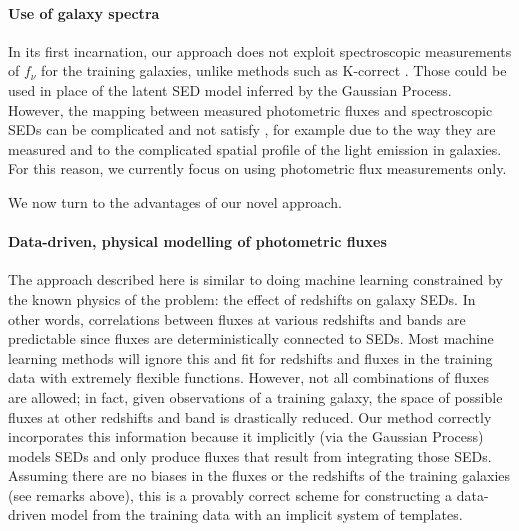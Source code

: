 \documentclass[aps,prd,showpacs,superscriptaddress,groupedaddress]{revtex4}  %
\begin{document}
\paragraph{Use of galaxy spectra}
In its first incarnation, our approach does not exploit spectroscopic measurements of $f_\nu$ for the training galaxies, unlike methods such as K-correct \cite{Blanton:2007}.
Those could be used in place of the latent SED model inferred by the Gaussian Process. 
However, the mapping between measured photometric fluxes and spectroscopic SEDs can be complicated and not satisfy , for example due to the way they are measured and to the complicated spatial profile of the light emission in galaxies. 
For this reason, we currently focus on using photometric flux measurements only.

\smallskip
We now turn to the advantages of our novel approach.
\smallskip

\paragraph{Data-driven, physical modelling of photometric fluxes}
The approach described here is similar to doing machine learning constrained by the known physics of the problem: the effect of redshifts on galaxy SEDs.
In other words, correlations between fluxes at various redshifts and bands are predictable since fluxes are deterministically connected to SEDs.
Most machine learning methods will ignore this and fit for redshifts and fluxes in the training data with extremely flexible functions.
However, not all combinations of fluxes are allowed; in fact, given observations of a training galaxy, the space of possible fluxes at other redshifts and band is drastically reduced.
Our method correctly incorporates this information because it implicitly (via the Gaussian Process) models SEDs and only produce fluxes that result from integrating those SEDs.
Assuming there are no biases in the fluxes or the redshifts of the training galaxies (see remarks above), this is a provably correct scheme for constructing a data-driven model from the training data with an implicit system of templates.
\end{document}
